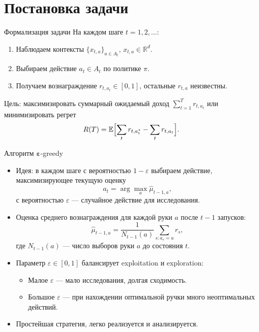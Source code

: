 \documentclass[10pt]{beamer}
\begin{document}
\section{Постановка задачи}
\begin{frame}{Формализация задачи}
  На каждом шаге $t=1,2,\dots$:
  \begin{enumerate}
    \item Наблюдаем контексты $\{x_{t,a}\}_{a\in A_t}$, $x_{t,a}\in\mathbb{R}^d$.
    \item Выбираем действие $a_t\in A_t$ по политике $\pi$.
    \item Получаем вознаграждение $r_{t,a_t}\in[0,1]$, остальные $r_{t,a}$ неизвестны.
  \end{enumerate}
  Цель: максимизировать суммарный ожидаемый доход $\displaystyle \sum_{t=1}^T r_{t,a_t}$ или минимизировать регрет
  \[ R(T)=\mathbb{E}\Bigl[\sum_t r_{t,a^*_t}-\sum_t r_{t,a_t}\Bigr]. \]
\end{frame}
\begin{frame}{Алгоритм $\boldsymbol{\varepsilon}$-greedy}
  \begin{itemize}
    \item Идея: в каждом шаге с вероятностью $1-\varepsilon$ выбираем действие, максимизирующее текущую оценку
    $$a_t = \arg\max_a \hat{\mu}_{t-1,a},$$
    с вероятностью $\varepsilon$ — случайное действие для исследования.
    \item Оценка среднего вознаграждения для каждой руки $a$ после $t-1$ запусков:
    $$\hat{\mu}_{t-1,a} = \frac{1}{N_{t-1}(a)} \sum_{s: a_s = a} r_s,$$
    где $N_{t-1}(a)$ — число выборов руки $a$ до состояния $t$.
    \item Параметр $\varepsilon\in[0,1]$ балансирует exploitation и exploration:
    \begin{itemize}
      \item Малое $\varepsilon$ — мало исследования, долгая сходимость.
      \item Большое $\varepsilon$ — при нахождении оптимальной ручки много неоптимальных действий.
    \end{itemize}
    \item Простейшая стратегия, легко реализуется и анализируется.
  \end{itemize}
\end{frame}
\end{document}
